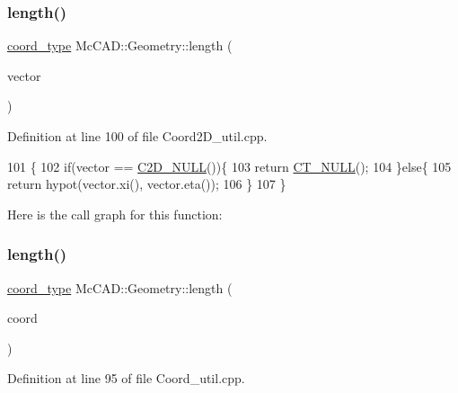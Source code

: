 \subsubsection{\texorpdfstring{length()}{length()}\hspace{0.1cm}{\footnotesize\ttfamily [1/3]}}
{\footnotesize\ttfamily \hyperlink{namespaceMcCAD_1_1Geometry_ac043b37a4a7e849fca22869e1982d2f8}{coord\+\_\+type} Mc\+C\+A\+D\+::\+Geometry\+::length (\begin{DoxyParamCaption}\item[{const \hyperlink{classMcCAD_1_1Geometry_1_1Coord2D}{Coord2D} \&}]{vector }\end{DoxyParamCaption})}



Definition at line 100 of file Coord2\+D\+\_\+util.\+cpp.


\begin{DoxyCode}
101                               \{
102     \textcolor{keywordflow}{if}(vector == \hyperlink{namespaceMcCAD_1_1Geometry_a14ff5fd2db066e4dfad0a638f03762a2}{C2D\_NULL}())\{
103         \textcolor{keywordflow}{return} \hyperlink{namespaceMcCAD_1_1Geometry_a7a1a1f1e3e0547cde4d81dec1a126c28}{CT\_NULL}();
104     \}\textcolor{keywordflow}{else}\{
105         \textcolor{keywordflow}{return} hypot(vector.xi(), vector.eta());
106     \}
107 \}
\end{DoxyCode}
Here is the call graph for this function\+:
\mbox{\label{namespaceMcCAD_1_1Geometry_ad2997914c766f1fc561cdd30032b6777}} 
\subsubsection{\texorpdfstring{length()}{length()}\hspace{0.1cm}{\footnotesize\ttfamily [2/3]}}
{\footnotesize\ttfamily \hyperlink{namespaceMcCAD_1_1Geometry_ac043b37a4a7e849fca22869e1982d2f8}{coord\+\_\+type} Mc\+C\+A\+D\+::\+Geometry\+::length (\begin{DoxyParamCaption}\item[{const \hyperlink{classMcCAD_1_1Geometry_1_1Coord}{Coord} \&}]{coord }\end{DoxyParamCaption})}



Definition at line 95 of file Coord\+\_\+util.\+cpp.


